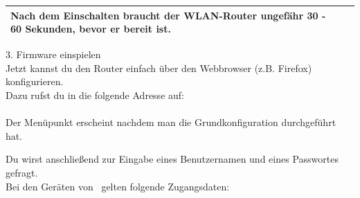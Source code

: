 \begin{table}[H]
\begin{tabular}{|m{}|m{}|}
\begin{minipage}{0.6\textwidth}
  Nach dem Einschalten braucht der WLAN-Router ungefähr 30 - 60 Sekunden, bevor er bereit ist.
\end{minipage}

\\
 \hline
\end{tabular}
\end{table}






{\Large 3. Firmware einspielen} \\

Jetzt kannst du den Router einfach über den Webbrowser (z.B. Firefox) konfigurieren.\\
Dazu rufst du in die folgende Adresse auf: \\

 \\

Der Menüpunkt  erscheint nachdem man die Grundkonfiguration durchgeführt hat.

Du wirst anschließend zur Eingabe eines Benutzernamen und eines Passwortes gefragt. \\
Bei den Geräten von \printVendor\ gelten folgende Zugangsdaten:

\\%


















